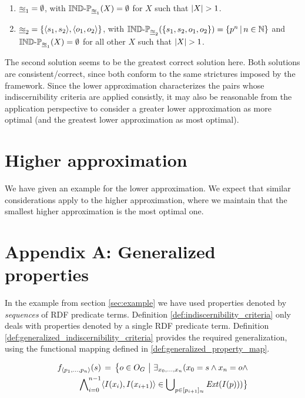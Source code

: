 \documentclass[a4paper]{article}
\begin{document}
\begin{enumerate}
\item $\underline{\approx}_1 = \emptyset$,
      with $\operatorname{{\mathbb{IND}-\mathbb{P}}}_{\underline{\approx}_1}(X) = \emptyset$
      for $X$ such that $\lvert X\rvert > 1$.
\item $\underline{\approx}_2 = \{\langle s_1,s_2\rangle,\langle o_1,o_2\rangle\}$,
      with $\operatorname{{\mathbb{IND}-\mathbb{P}}}_{\underline{\approx}_2}(\{s_1,s_2,o_1,o_2\}) = \{p^n\,\vert\,n \in \mathbb{N}\}$
      and $\operatorname{{\mathbb{IND}-\mathbb{P}}}_{\underline{\approx}_1}(X) = \emptyset$
      for all other $X$ such that $\lvert X\rvert > 1$.
\end{enumerate}

The second solution seems to be the greatest correct solution here.
Both solutions are consistent/correct,
  since both conform to the same strictures imposed by the framework.
Since the lower approximation characterizes the pairs
  whose indiscernibility criteria are applied consistly,
  it may also be reasonable from the application perspective to
  consider a greater lower approximation as more optimal
  (and the greatest lower approximation as most optimal).

\section{Higher approximation}

We have given an example for the lower approximation.
We expect that similar considerations apply to the higher approximation,
  where we maintain that the smallest higher approximation is
  the most optimal one.

\section{Appendix A: Generalized properties}

In the example from section \ref{sec:example} we have used
  properties denoted by \emph{sequences} of RDF predicate terms.
Definition \ref{def:indiscernibility_criteria} only deals with properties
  denoted by a single RDF predicate term.
Definition \ref{def:generalized_indiscernibility_criteria}
  provides the required generalization,
  using the functional mapping
  defined in \ref{def:generalized_property_map}.

\small
\begin{definition}
\begin{align}
\label{def:generalized_property_map}
  f_{\langle p_1,\ldots,p_n\rangle}(s)
\,=\,
  \big\{o \in O_G\,\,\big\vert\,\,
    \exists_{x_0,\ldots,x_n}(
      x_0 = s \land x_n = o \land\nonumber\\
      \bigwedge_{i=0}^{n-1}\nolimits
          \langle I(x_i),I(x_{i+1})\rangle
        \in
          \bigcup_{p \in [p_{i+1}]_{\approx}}\nolimits \mathit{Ext}(I(p))
    )
  \big\}\nonumber
\end{align}
\end{definition}
\normalsize
\end{document}
